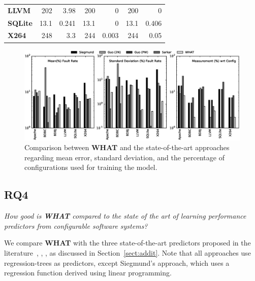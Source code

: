 \documentclass{newsig}
\newcommand{\what}{{\bf WHAT }}
\begin{document}
\begin{table}[tbh]
\begin{tabular}{lrrrrrr}
\textbf{LLVM}                     & 202              & 3.98            & 200             & 0              & 200               & 0                \\ 
\textbf{SQLite}                   & 13.1             & 0.241           & 13.1            & 0              & 13.1              & 0.406            \\ 
\textbf{X264}                     & 248              & 3.3             & 244             & 0.003          & 244               & 0.05             \\ \bottomrule
\end{tabular}
\end{table}

\begin{figure}[tbh]
\includegraphics[width=\linewidth]{Figures/compare_graph_h}
\caption{Comparison between \what and the state-of-the-art approaches regarding mean error, standard deviation, and the percentage of configurations used for training the model.} \label{fig:Comparison}
\end{figure}
 
\subsection{RQ4}



 \begin{center}
{\em How good is \what compared to the state of the art of learning performance predictors from configurable software systems?}
\end{center}

We compare \what with the three state-of-the-art predictors proposed in the literature~\cite{siegmund2012predicting}, \cite{guo2013variability}, \cite{sarkar2015cost}, as discussed in Section~\ref{sect:addit}. Note that all approaches use regression-trees as predictors, except Siegmund's approach, which uses a regression function derived using linear programming.
 
\end{document}
